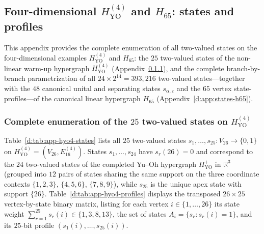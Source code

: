 \documentclass[aps,pra,reprint,superscriptaddress,longbibliography,nofootinbib,floatfix,10pt]{revtex4-2}
\theoremstyle{definition}
\newcommand{\R}{\mathbb{R}}
\newcommand{\YO}{\mathrm{YO}}
\begin{document}
\subsection{\texorpdfstring{Four-dimensional $H_{\YO}^{(4)}$ and $H_{65}$: states and profiles}{Four-dimensional HYO(4) and H65: states and profiles}}

This appendix provides the complete enumeration of all two-valued states on the four-dimensional examples $H_{\YO}^{(4)}$ and $H_{65}$: the $25$ two-valued states of the non-linear warm-up hypergraph $H_{\YO}^{(4)}$ (Appendix~\ref{d:app:states-hyo4}), and the complete branch-by-branch parametrization of all $24\times 2^{14}=393{,}216$ two-valued states---together with the $48$ canonical unital and separating states $s_{\alpha,\varepsilon}$ and the $65$ vertex state-profiles---of the canonical linear hypergraph $H_{65}$ (Appendix~\ref{d:app:states-h65}).

\subsubsection{Complete enumeration of the \texorpdfstring{$25$}{25} two-valued states on \texorpdfstring{$H_{\YO}^{(4)}$}{HYO(4)}}\label{d:app:states-hyo4}

Table~\ref{d:tab:app-hyo4-states} lists all $25$ two-valued states $s_1,\ldots,s_{25}:V_{26}\to\{0,1\}$ on $H_{\YO}^{(4)}=(V_{26},E_{16}^{(4)})$. States $s_1,\ldots,s_{24}$ have $s_r(26)=0$ and correspond to the $24$ two-valued states of the completed Yu--Oh hypergraph $H_{\YO}^{+}$ in $\R^3$ (grouped into $12$ pairs of states sharing the same support on the three coordinate contexts $\{1,2,3\}$, $\{4,5,6\}$, $\{7,8,9\}$), while $s_{25}$ is the unique apex state with support $\{26\}$. Table~\ref{d:tab:app-hyo4-profiles} displays the transposed $26\times 25$ vertex-by-state binary matrix, listing for each vertex $i\in\{1,\ldots,26\}$ its state weight $\sum_{r=1}^{25}s_r(i)\in\{1,3,8,13\}$, the set of states $A_i=\{s_r : s_r(i)=1\}$, and its $25$-bit profile $(s_1(i),\ldots,s_{25}(i))$.
\end{document}
